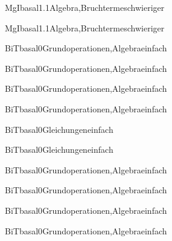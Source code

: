 \documentclass[12pt]{article}
\begin{document}
    \begin{Add}{MgI}{basal1.1}{Algebra,Bruchterme}{schwieriger}
    \solution{ }
    \end{Add}
    \begin{Add}{MgI}{basal1.1}{Algebra,Bruchterme}{schwieriger}
    \end{Add}
    

\begin{Add}{BiT}{basal0}{Grundoperationen,Algebra}{einfach}
\solution{ }
\end{Add}
\begin{Add}{BiT}{basal0}{Grundoperationen,Algebra}{einfach}
\end{Add}

\begin{Add}{BiT}{basal0}{Grundoperationen,Algebra}{einfach}
\solution{ }
\end{Add}
\begin{Add}{BiT}{basal0}{Grundoperationen,Algebra}{einfach}
\end{Add}

\begin{Add}{BiT}{basal0}{Gleichungen}{einfach}
\solution{ }
\end{Add}
\begin{Add}{BiT}{basal0}{Gleichungen}{einfach}
\end{Add}

\begin{Add}{BiT}{basal0}{Grundoperationen,Algebra}{einfach}
\solution{ }
\end{Add}
\begin{Add}{BiT}{basal0}{Grundoperationen,Algebra}{einfach}
\end{Add}

\begin{Add}{BiT}{basal0}{Grundoperationen,Algebra}{einfach}
\solution{ }
\end{Add}
\begin{Add}{BiT}{basal0}{Grundoperationen,Algebra}{einfach}
\end{Add}
\end{document}
